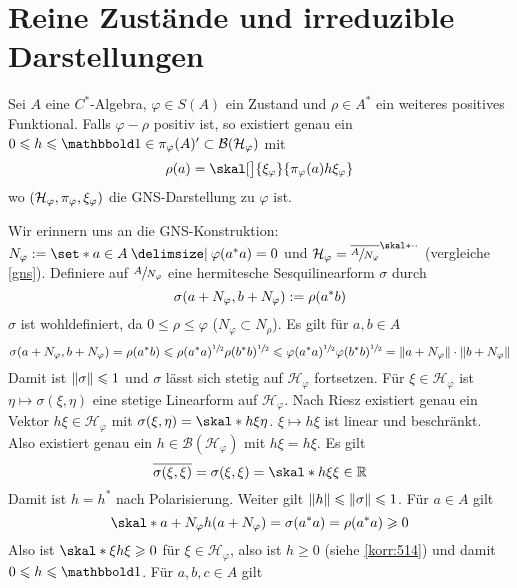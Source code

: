 \section{Reine Zustände und irreduzible Darstellungen} %
\label{sec:7}
\begin{proposition}[label=prop:71]
	Sei $A$ eine $C^*$-Algebra, $\varphi \in S(A)$ ein Zustand und $\rho \in A^*$ ein weiteres positives Funktional.
	Falls $\varphi-\rho$ positiv ist, so existiert genau ein $0 \le h \le \ind \in \pi_\varphi(A)' \subset \mathcal{B}(\mathcal{H}_\varphi)$ mit 
	\[
		\rho(a) = \skal[\big]{\xi_\varphi}{\pi_\varphi(a)h \xi_\varphi}
	\]
	wo $\enbrace*{\mathcal{H}_\varphi,\pi_\varphi,\xi_\varphi}$ die GNS-Darstellung zu $\varphi$ ist.
\end{proposition}
\begin{beweis}
	Wir erinnern uns an die GNS-Konstruktion: $N_\varphi := \set*{a \in A \given \varphi(a^*a)=0}$ und $\mathcal{H}_\varphi = \overline{\sfrac{A}{N_\varphi}}^{\skal*{\cdot}{\cdot}}$ (vergleiche \autoref{gns}).
	Definiere auf $\sfrac{A}{N_\varphi}$ eine hermitesche Sesquilinearform $\sigma$ durch 
	\[
		\sigma \enbrace*{a + N_\varphi, b+ N_\varphi} := \rho(a^* b)
	\]
	$\sigma$ ist wohldefiniert, da $0 \le \rho \le \varphi$ ($N_\varphi \subset N_\rho$).
	Es gilt für $a,b \in A$
	\[
		\sigma \enbrace*{a+ N_\varphi, b+N_\varphi} = \rho(a^*b) \le \rho(a^*a)^{\sfrac{1}{2}} \rho(b^*b)^{\sfrac{1}{2}} \le \varphi(a^*a)^{\sfrac{1}{2}} \varphi(b^*b)^{\sfrac{1}{2}} 
		= \norm*{a + N_\varphi} \cdot \norm*{b+ N_\varphi}
	\]
	Damit ist $\norm*{\sigma}\le 1$ und $\sigma$ lässt sich stetig auf $\mathcal{H}_\varphi$ fortsetzen.
	Für $\xi \in \mathcal{H}_\varphi$ ist $\eta \mapsto \sigma(\xi,\eta)$ eine stetige Linearform auf $\mathcal{H}_\varphi$.
	Nach Riesz existiert genau ein Vektor $h \xi\in \mathcal{H}_\varphi$ mit $\sigma(\xi,\eta) = \skal*{h \xi}{\eta}$.
	$\xi \mapsto h \xi$ ist linear und beschränkt. 
	Also existiert genau ein $h \in \mathcal{B}(\mathcal{H}_\varphi)$ mit $h \xi= h \xi$.
	Es gilt 
	\[
		\overline{\sigma(\xi,\xi)}=\sigma(\xi,\xi)= \skal*{h \xi}{\xi} \in \mathbb{R}
	\]
	Damit ist $h=h^*$ nach Polarisierung.
	Weiter gilt $\norm*{h} \le \norm*{\sigma} \le 1$.
	Für $a \in A$ gilt 
	\[
		\skal*{a + N_\varphi}{h \enbrace*{a+ N_\varphi}}= \sigma(a^*a)=\rho(a^*a)\ge 0
	\]
	Also ist $\skal*{\xi}{h \xi} \ge 0$ für $\xi \in \mathcal{H}_\varphi$, also ist $h \ge 0$ (siehe \autoref{korr:514}) und damit $0 \le h \le \ind$.
	Für $a,b,c \in A$ gilt 
	\begin{align}

\end{align}
\end{beweis}
